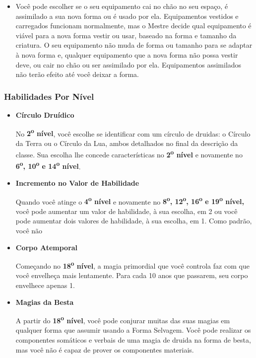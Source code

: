 \documentclass[a4paper,12p]{book}
\begin{document}
\begin{multicols}{2}
\begin{itemize}
		\item Você pode escolher se o seu equipamento cai no chão no seu espaço, é assimilado a sua nova forma ou é usado por ela. Equipamentos vestidos e carregados funcionam normalmente, mas o Mestre decide qual equipamento é viável para a nova forma vestir ou usar, baseado na forma e tamanho da criatura. O seu equipamento não muda de forma ou tamanho para se adaptar à nova forma e, qualquer equipamento que a nova forma não possa vestir deve, ou cair no chão ou ser assimilado por ela. Equipamentos assimilados não terão efeito até você deixar a forma.
	\end{itemize}

	\subsubsection{Habilidades Por Nível}
	\begin{itemize}
		\item \textbf{Círculo Druídico} 
		
		No \textbf{2\textsuperscript{o} nível}, você escolhe se identificar com um círculo de druidas: o Círculo da Terra ou o Círculo da Lua, ambos detalhados no final da descrição da classe. Sua escolha lhe concede características no \textbf{2\textsuperscript{o} nível} e novamente no \textbf{6\textsuperscript{o}, 10\textsuperscript{o} e 14\textsuperscript{o} nível}.
		
		\item \textbf{Incremento no Valor de Habilidade}
		
		Quando você atinge o \textbf{4\textsuperscript{o} nível} e novamente no \textbf{8\textsuperscript{o}, 12\textsuperscript{o}, 16\textsuperscript{o} e 19\textsuperscript{o} nível,} você pode aumentar um valor de habilidade, à sua escolha, em 2 ou você pode aumentar dois valores de habilidade, à sua escolha, em 1. Como padrão, você não
		
		\item \textbf{Corpo Atemporal}
		
		Começando no \textbf{18\textsuperscript{o} nível}, a magia primordial que você controla faz com que você envelheça mais lentamente. Para cada 10 anos que passarem, seu corpo envelhece apenas 1.
		
		\item \textbf{Magias da Besta}
		
		A partir do \textbf{18\textsuperscript{o} nível}, você pode conjurar muitas das suas magias em qualquer forma que assumir usando a Forma Selvagem. Você pode realizar os componentes somáticos e verbais de uma magia de druida na forma de besta, mas você não é capaz de prover os componentes materiais.
		

\end{itemize}
\end{multicols}
\end{document}

